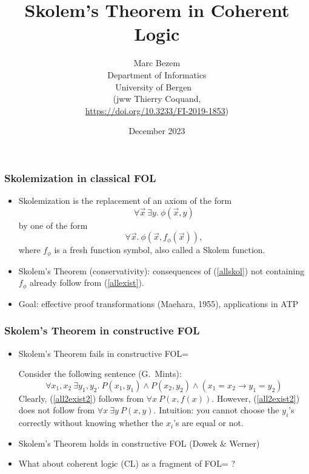 \documentclass[handout,11pt,hyperref ={colorlinks = true, urlcolor = red}]{beamer}
\title{Skolem's Theorem in Coherent Logic}
\author{Marc Bezem\\
Department of Informatics\\
University of Bergen
\mbox{ }\\
(jww Thierry Coquand,\\
\url{https://doi.org/10.3233/FI-2019-1853})
}
\date{December 2023}
\begin{document}
\frame{\titlepage}


\begin{frame}
\frametitle{Skolemization in classical FOL}
\begin{itemize}[<+->]   %
    \item
Skolemization is the replacement of an axiom of the form
\begin{equation}\label{allexist}
\forall\vec{x}~\exists y.~\phi(\vec{x},y)
\end{equation}
by one of the form
\begin{equation}\label{allskol}
\forall\vec{x}.~\phi(\vec{x},f_\phi(\vec{x})),
\end{equation}
where $f_\phi$ is a fresh function symbol, also called a Skolem function.

\item
Skolem's Theorem (conservativity): consequences of (\ref{allskol}) not 
containing $f_\phi$ already follow from (\ref{allexist}).
\item
Goal: effective proof transformations (Maehara, 1955),
applications in ATP
\end{itemize} 
\end{frame}

\begin{frame}
\frametitle{Skolem's Theorem in constructive FOL}

\begin{itemize}[<+->]   %
    \item
Skolem's Theorem fails in constructive FOL=

Consider the following sentence (G.\ Mints):
\begin{equation}\label{all2exist2}
\forall x_1,x_2~\exists y_1,y_2. ~P(x_1,y_1) \land P(x_2,y_2) \land (x_1 = x_2 \to y_1 = y_2)
\end{equation}
Clearly, (\ref{all2exist2}) follows from $\forall{x}~P({x},f(x))$.
However, (\ref{all2exist2}) does not follow from 
$\forall{x}~\exists y~P({x},y)$. Intuition: you cannot choose the $y_i$'s
correctly without knowing whether the $x_i$'s are equal or not.
\item
Skolem's Theorem holds in constructive FOL (Dowek \& Werner)
\item What about coherent logic (CL) as a fragment of FOL= ?
\end{itemize}
\end{frame}
\end{document}
